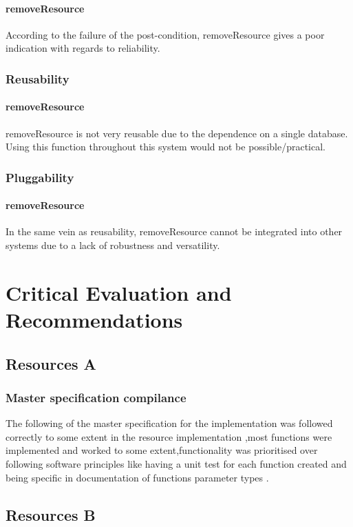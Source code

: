 \documentclass[a4paper]{article}
\begin{document}
\paragraph{removeResource}
According to the failure of the post-condition, removeResource gives a poor indication with regards to reliability.

\subsubsection {Reusability}

\paragraph{removeResource}
removeResource is not very reusable due to the dependence on a single database. Using this function throughout this system would not be possible/practical.

\subsubsection {Pluggability}

\paragraph{removeResource}
In the same vein as reusability, removeResource cannot be integrated into other systems due to a lack of robustness and versatility.


\section {Critical Evaluation and Recommendations}
\subsection {Resources A}
\subsubsection {Master specification compilance}
The following of the master specification for the implementation was followed correctly to some extent in the resource implementation ,most functions were implemented and worked to some extent,functionality was prioritised over following software principles like having a unit test for each function created and being specific in documentation of functions parameter types .

\subsection {Resources B}
\end{document}
